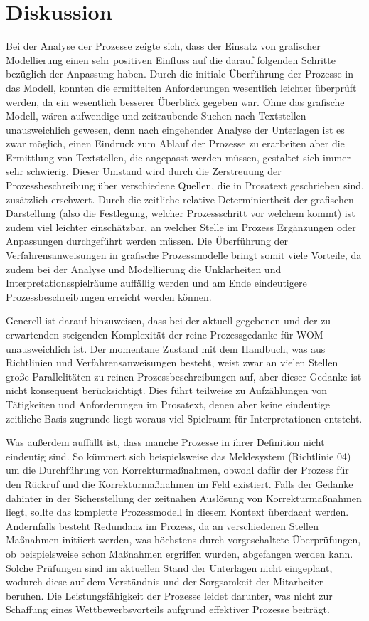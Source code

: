 \documentclass[a4paper,12pt]{report}
\begin{document}
\section{Diskussion}\label{section:Diskussion}
Bei der Analyse der Prozesse zeigte sich, dass der Einsatz von grafischer Modellierung einen sehr positiven Einfluss auf die darauf folgenden Schritte bezüglich der Anpassung haben. Durch die initiale Überführung der Prozesse in das Modell, konnten die ermittelten Anforderungen wesentlich leichter überprüft werden, da ein wesentlich besserer Überblick gegeben war. Ohne das grafische Modell, wären aufwendige und zeitraubende Suchen nach Textstellen unausweichlich gewesen, denn nach eingehender Analyse der Unterlagen ist es zwar möglich, einen Eindruck zum Ablauf der Prozesse zu erarbeiten aber die Ermittlung von Textstellen, die angepasst werden müssen, gestaltet sich immer sehr schwierig. Dieser Umstand wird durch die Zerstreuung der Prozessbeschreibung über verschiedene Quellen, die in Prosatext geschrieben sind, zusätzlich erschwert. Durch die zeitliche relative Determiniertheit der grafischen Darstellung (also die Festlegung, welcher Prozessschritt vor welchem kommt) ist zudem viel leichter einschätzbar, an welcher Stelle im Prozess Ergänzungen oder Anpassungen durchgeführt werden müssen. Die Überführung der Verfahrensanweisungen in grafische Prozessmodelle bringt somit viele Vorteile, da zudem bei der Analyse und Modellierung die Unklarheiten und Interpretationsspielräume auffällig werden und am Ende eindeutigere Prozessbeschreibungen erreicht werden können.

Generell ist darauf hinzuweisen, dass bei der aktuell gegebenen und der zu erwartenden steigenden Komplexität der reine Prozessgedanke für WOM unausweichlich ist. Der momentane Zustand mit dem Handbuch, was aus Richtlinien und Verfahrensanweisungen besteht, weist zwar an vielen Stellen große Parallelitäten zu reinen Prozessbeschreibungen auf, aber dieser Gedanke ist nicht konsequent berücksichtigt. Dies führt teilweise zu Aufzählungen von Tätigkeiten und Anforderungen im Prosatext, denen aber keine eindeutige zeitliche Basis zugrunde liegt woraus viel Spielraum für Interpretationen entsteht.

Was außerdem auffällt ist, dass manche Prozesse in ihrer Definition nicht eindeutig sind. So kümmert sich beispielsweise das Meldesystem (Richtlinie 04) um die Durchführung von Korrekturmaßnahmen, obwohl dafür der Prozess für den Rückruf und die Korrekturmaßnahmen im Feld existiert. Falls der Gedanke dahinter in der Sicherstellung der zeitnahen Auslösung von Korrekturmaßnahmen liegt, sollte das komplette Prozessmodell in diesem Kontext überdacht werden. Andernfalls besteht Redundanz im Prozess, da an verschiedenen Stellen Maßnahmen initiiert werden, was höchstens durch vorgeschaltete Überprüfungen, ob beispielsweise schon Maßnahmen ergriffen wurden, abgefangen werden kann. Solche Prüfungen sind im aktuellen Stand der Unterlagen nicht eingeplant, wodurch diese auf dem Verständnis und der Sorgsamkeit der Mitarbeiter beruhen. Die Leistungsfähigkeit der Prozesse leidet darunter, was nicht zur Schaffung eines Wettbewerbsvorteils aufgrund effektiver Prozesse beiträgt.
\end{document}
